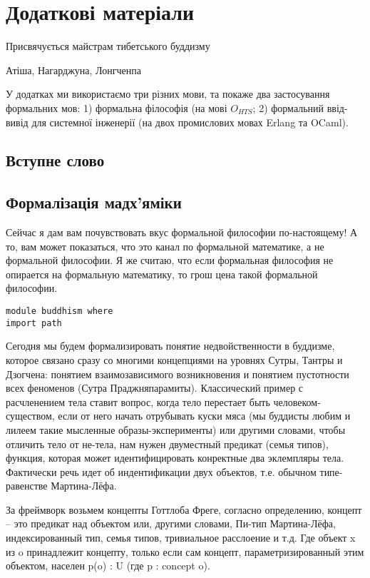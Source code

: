 \chapter{Додаткові матеріали}
\epigraph{Присвячується майстрам тибетського буддизму}{Атіша, Нагарджуна, Лонгченпа}

У додатках ми використаємо три різних мови, та покаже два застосування
формальних мов: 1) формальна філософія (на мові $O_{HTS}$; 2) формальний ввід-вивід для
системної інженерії (на двох промислових мовах Erlang та OCaml).

\section*{Вступне слово}

\section{Формалізація мадх'яміки}

Сейчас я дам вам почувствовать вкус формальной философии по-настоящему!
А то, вам может показаться, что это канал по формальной математике,
а не формальной философии. Я же считаю, что если формальная философия
не опирается на формальную математику, то грош цена такой формальной философии. 

\begin{lstlisting}
module buddhism where
import path
\end{lstlisting}

Сегодня мы будем формализировать понятие недвойственности в буддизме,
которое связано сразу со многими концепциями на уровнях Сутры,
Тантры и Дзогчена: понятием взаимозависимого возникновения и
понятием пустотности всех феноменов (Сутра Праджняпарамиты).
Классический пример с расчленением тела ставит вопрос, когда
тело перестает быть человеком-существом, если от него начать
отрубывать куски мяса (мы буддисты любим и лилеем такие мысленные
образы-эксперименты) или другими словами, чтобы отличить тело от
не-тела, нам нужен двуместный предикат (семья типов), функция,
которая может идентифицировать конректные два эклемпляры тела.
Фактически речь идет об индентификации двух объектов, т.е. обычном
типе-равенстве Мартина-Лёфа.

За фреймворк возьмем концепты Готтлоба Фреге, согласно определению,
концепт -- это предикат над объектом или, другими словами, Пи-тип
Мартина-Лёфа, индексированный тип, семья типов, тривиальное
расслоение и т.д. Где объект x из o принадлежит концепту,
только если сам концепт, параметризированный этим объектом,
населен p(o) : U (где p : concept o).

